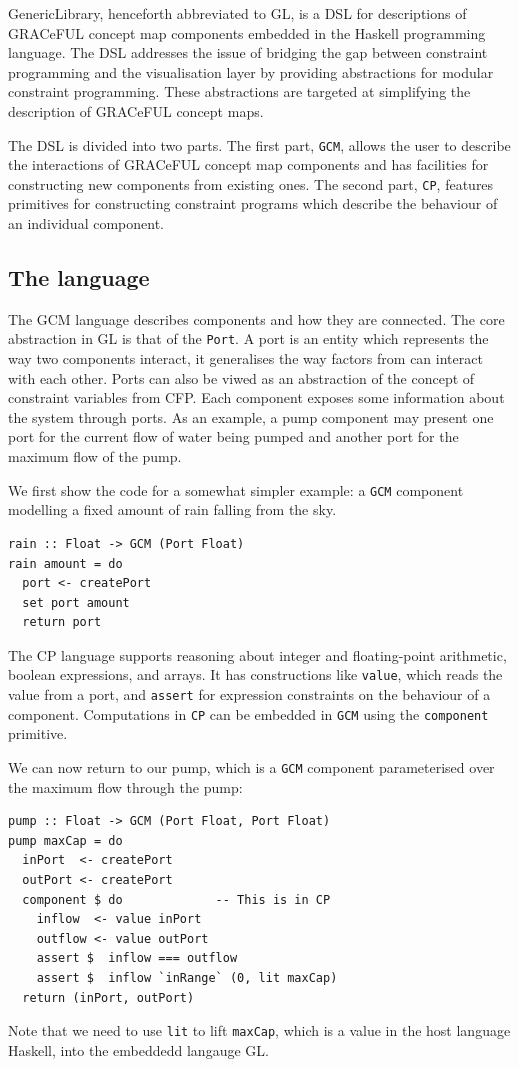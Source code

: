 GenericLibrary, henceforth abbreviated to GL, is a DSL for
descriptions of GRACeFUL concept map components embedded in the
Haskell programming language.
%
The DSL addresses the issue of bridging the gap between constraint
programming and the visualisation layer by providing abstractions for
modular constraint programming.
%
These abstractions are targeted at simplifying the description of
GRACeFUL concept maps.

The DSL is divided into two parts.
%
The first part, \texttt{GCM}, allows the user to describe the
interactions of GRACeFUL concept map components and has facilities for
constructing new components from existing ones.
%
The second part, \texttt{CP}, features primitives for constructing
constraint programs which describe the behaviour of an individual
component.

\subsection{The language}

The GCM language describes components and how they are connected.
%
The core abstraction in GL is that of the \texttt{Port}.
%
A port is an entity which represents the way two components interact,
it generalises the way factors from \cite{D4.1} can interact with each
other.
%
Ports can also be viwed as an abstraction of the concept of constraint
variables from CFP.
%
Each component exposes some information about the system through
ports.
%
As an example, a pump component may present one port for the current
flow of water being pumped and another port for the maximum flow of
the pump.

We first show the code for a somewhat simpler example: a \texttt{GCM}
component modelling a fixed amount of rain falling from the sky.
\begin{verbatim}
rain :: Float -> GCM (Port Float)
rain amount = do
  port <- createPort
  set port amount
  return port
\end{verbatim}

The CP language supports reasoning about integer and floating-point
arithmetic, boolean expressions, and arrays.
%
It has constructions like \texttt{value}, which reads the value from a
port, and \texttt{assert} for expression constraints on the behaviour
of a component.
%
Computations in \texttt{CP} can be embedded in \texttt{GCM} using the
\texttt{component} primitive.

We can now return to our pump, which is a \texttt{GCM} component
parameterised over the maximum flow through the pump:
%
\begin{verbatim}
pump :: Float -> GCM (Port Float, Port Float)
pump maxCap = do
  inPort  <- createPort
  outPort <- createPort
  component $ do             -- This is in CP
    inflow  <- value inPort
    outflow <- value outPort
    assert $  inflow === outflow
    assert $  inflow `inRange` (0, lit maxCap)
  return (inPort, outPort)
\end{verbatim}
%
Note that we need to use \texttt{lit} to lift \texttt{maxCap}, which
is a value in the host language Haskell, into the embeddedd langauge
GL.

